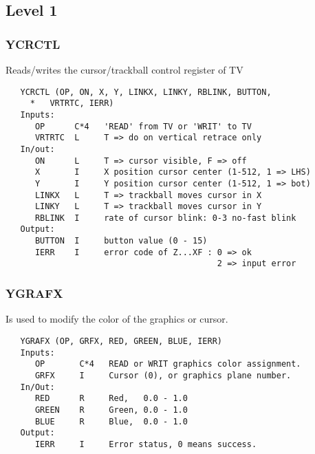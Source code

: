 \subsection{Level 1}

\subsubsection{YCRCTL}
Reads/writes the cursor/trackball control register of TV
\begin{verbatim}
   YCRCTL (OP, ON, X, Y, LINKX, LINKY, RBLINK, BUTTON,
     *   VRTRTC, IERR)
   Inputs:
      OP      C*4   'READ' from TV or 'WRIT' to TV
      VRTRTC  L     T => do on vertical retrace only
   In/out:
      ON      L     T => cursor visible, F => off
      X       I     X position cursor center (1-512, 1 => LHS)
      Y       I     Y position cursor center (1-512, 1 => bot)
      LINKX   L     T => trackball moves cursor in X
      LINKY   L     T => trackball moves cursor in Y
      RBLINK  I     rate of cursor blink: 0-3 no-fast blink
   Output:
      BUTTON  I     button value (0 - 15)
      IERR    I     error code of Z...XF : 0 => ok
                                           2 => input error

\end{verbatim}

\subsubsection{YGRAFX}
Is used to modify the color of the graphics or cursor.
\begin{verbatim}
   YGRAFX (OP, GRFX, RED, GREEN, BLUE, IERR)
   Inputs:
      OP       C*4   READ or WRIT graphics color assignment.
      GRFX     I     Cursor (0), or graphics plane number.
   In/Out:
      RED      R     Red,   0.0 - 1.0
      GREEN    R     Green, 0.0 - 1.0
      BLUE     R     Blue,  0.0 - 1.0
   Output:
      IERR     I     Error status, 0 means success.

\end{verbatim}

